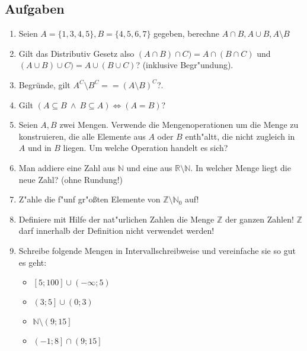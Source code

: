 \subsection{Aufgaben}
\begin{enumerate}
	\item Seien $A = \{1,3,4,5\}, B = \{4, 5, 6, 7\}$ gegeben, berechne $A \cap B, A \cup B, A \setminus B$
	\item Gilt das Distributiv Gesetz also $(A \cap B) \cap C) = A \cap (B \cap C)$ und $(A \cup B) \cup C) = A \cup (B \cup C)$? (inklusive Begr"undung).
	\item Begründe, gilt $A^C \setminus B^C == (A \setminus B)^C$?.
	\item Gilt $(A \subseteq B \ \land \ B \subseteq A) \iff (A = B)$?
	\item Seien $A, B$ zwei Mengen. Verwende die Mengenoperationen um die Menge zu konstruieren, die alle Elemente aus $A$ oder $B$ enth"altt, die nicht zugleich in $A$ und in $B$ liegen. Um welche Operation handelt es sich?
	\item Man addiere eine Zahl aus $\mathbb N$ und eine aus $\mathbb R \setminus \mathbb N$. In welcher Menge liegt die neue Zahl? (ohne Rundung!)
	\item Z"ahle die f"unf gr"oßten Elemente von $\mathbb Z \setminus \mathbb N_0$ auf!
	\item Definiere mit Hilfe der nat"urlichen Zahlen die Menge $\mathbb{Z}$ der ganzen Zahlen! $\mathbb Z$ darf innerhalb der Definition nicht verwendet werden!
	\item Schreibe folgende Mengen in Intervallschreibweise und vereinfache sie so gut es geht:
\begin{itemize}
	\item $\left[5;100\right] \cup \left(- \infty; 5\right)$
	\item $\left(3;5\right] \cup \left(0; 3\right)$
	\item $\mathbb{N} \setminus \left(9;15\right]$
	\item $\left(-1;8\right] \cap \left(9;15\right]$
\end{itemize}	

\end{enumerate}
